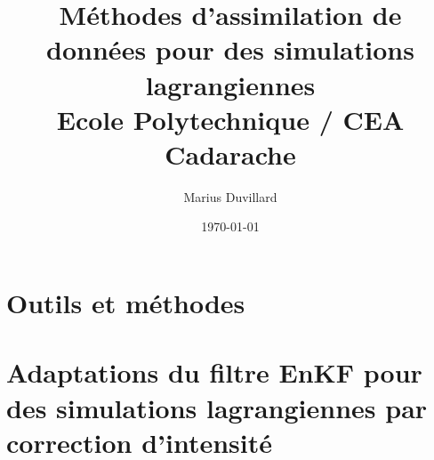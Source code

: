 \documentclass[a4paper]{report}
\title{
{Méthodes d'assimilation de données pour des simulations lagrangiennes}\\
{\large Ecole Polytechnique / CEA Cadarache}
}
\author{Marius Duvillard}
\date{\today}
\begin{document}
\maketitle
\tableofcontents





\chapter{Outils et méthodes}





\chapter{Adaptations du filtre EnKF pour des simulations lagrangiennes par correction d'intensité}









\begin{subappendices}
    
\end{subappendices}

% 
% 



% 
\printbibliography[heading=bibintoc]
% 
\end{document}
